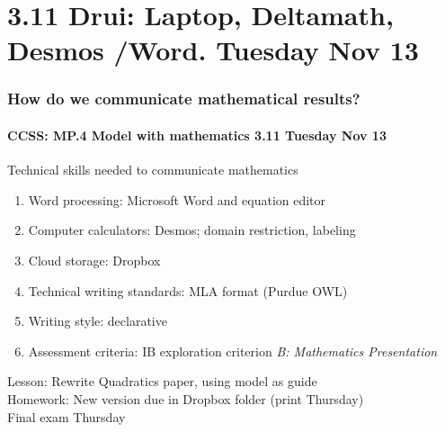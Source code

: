 \documentclass{beamer}
\begin{document}
  \section{3.11 Drui: Laptop, Deltamath, Desmos /Word. Tuesday Nov 13}
    \frame
    {
      \frametitle{How do we communicate mathematical results?}
      \framesubtitle{CCSS: MP.4 Model with mathematics  \alert{3.11 Tuesday Nov 13}}

      \begin{block}{Technical skills needed to communicate mathematics}
      \begin{enumerate}
          \item Word processing: Microsoft Word and equation editor
          \item Computer calculators: Desmos; domain restriction, labeling
          \item Cloud storage: Dropbox
          \item Technical writing standards: MLA format (Purdue OWL)
          \item Writing style: declarative
          \item Assessment criteria: IB exploration criterion \emph{B: Mathematics Presentation}
      \end{enumerate}
      \end{block}
      Lesson: Rewrite Quadratics paper, using model as guide\\ \bigskip
      Homework: New version due in Dropbox folder (print Thursday)\\
      \alert{Final exam Thursday}
    }
\end{document}
